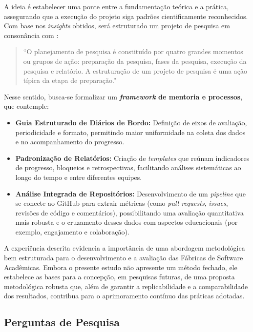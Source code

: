 \documentclass[
	12pt,           %
	openright,      %
	oneside,        %
	a4paper,        %
	brazil          %
]{abntex2}
\begin{document}
A ideia é estabelecer uma ponte entre a fundamentação teórica e a prática, assegurando que a execução do projeto siga padrões cientificamente reconhecidos. Com base nos \emph{insights} obtidos, será estruturado um projeto de pesquisa em consonância com :
\begin{quote}
    ``O planejamento de pesquisa é constituído por quatro grandes momentos ou grupos de ação: preparação da pesquisa, fases da pesquisa, execução da pesquisa e relatório. A estruturação de um projeto de pesquisa é uma ação típica da etapa de preparação.''
\end{quote}

Nesse sentido, busca-se formalizar um \textbf{\emph{framework} de mentoria e processos}, que contemple:
\begin{itemize}
    \item \textbf{Guia Estruturado de Diários de Bordo:} Definição de eixos de avaliação, periodicidade e formato, permitindo maior uniformidade na coleta dos dados e no acompanhamento do progresso.
    \item \textbf{Padronização de Relatórios:} Criação de \emph{templates} que reúnam indicadores de progresso, bloqueios e retrospectivas, facilitando análises sistemáticas ao longo do tempo e entre diferentes equipes.
    \item \textbf{Análise Integrada de Repositórios:} Desenvolvimento de um \emph{pipeline} que se conecte ao GitHub para extrair métricas (como \emph{pull requests}, \emph{issues}, revisões de código e comentários), possibilitando uma avaliação quantitativa mais robusta e o cruzamento desses dados com aspectos educacionais (por exemplo, engajamento e colaboração).
\end{itemize}

A experiência descrita evidencia a importância de uma abordagem metodológica bem estruturada para o desenvolvimento e a avaliação das Fábricas de Software Acadêmicas. Embora o presente estudo não apresente um método fechado, ele estabelece as bases para a concepção, em pesquisas futuras, de uma proposta metodológica robusta que, além de garantir a replicabilidade e a comparabilidade dos resultados, contribua para o aprimoramento contínuo das práticas adotadas.

\subsection{Perguntas de Pesquisa}
\end{document}
